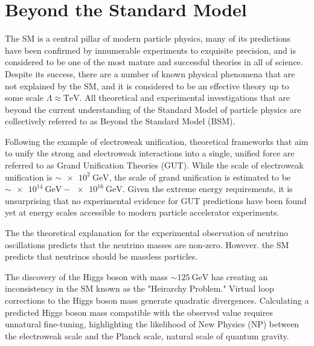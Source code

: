 \section{Beyond the Standard Model}
The SM is a central pillar of modern particle physics, many of its predictions have been confirmed by innumerable experiments to exquisite precision, and is considered to be one of the most mature and successful theories in all of science.
Despite its success, there are a number of known physical phenomena that are not explained by the SM, and it is considered to be an effective theory up to some scale $\Lambda \approx \si{\TeV}$.
All theoretical and experimental investigations that are beyond the current understanding of the Standard Model of particle physics are collectively referred to as Beyond the Standard Model (BSM).

Following the example of electroweak unification, theoretical frameworks that aim to unify the strong and electroweak interactions into a single, unified force are referred to as Grand Unification Theories (GUT).
While the scale of electroweak unification is $\sim \SI{e2}{\GeV}$, the scale of grand unification is estimated to be $\sim \SI{e14}{\GeV} - \SI{e16}{\GeV}$.
Given the extreme energy requirements, it is unsurprising that no experimental evidence for GUT predictions have been found yet at energy scales accessible to modern particle accelerator experiments.

The the theoretical explanation for the experimental observation of neutrino oscillations predicts that the neutrino masses are non-zero.
However. the SM predicts that neutrinos should be massless particles. 

The discovery of the Higgs boson with mass $\sim \SI{125}{\GeV}$ has creating an inconsistency in the SM known as the "Heirarchy Problem."
Virtual loop corrections to the Higgs boson mass generate quadratic divergences.
Calculating a predicted Higgs boson mass compatible with the observed value requires unnatural fine-tuning, highlighting the likelihood of New Physics (NP) between the electroweak scale and the Planck scale, natural scale of quantum gravity.

